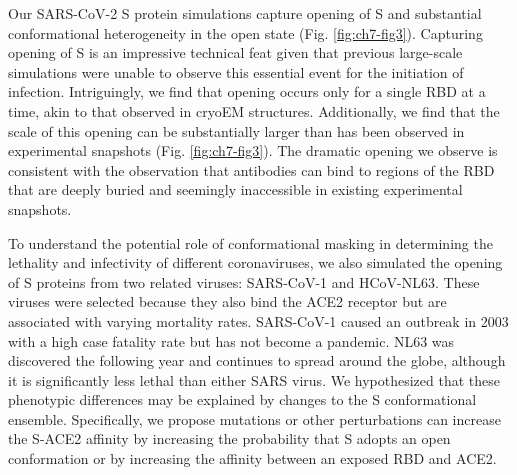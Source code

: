 \documentclass[../main.tex]{subfiles}
\begin{document}
        Our SARS-CoV-2 S protein simulations capture opening of S and substantial conformational heterogeneity in the open state (Fig. \ref{fig:ch7-fig3}). Capturing opening of S is an impressive technical feat given that previous large-scale simulations were unable to observe this essential event for the initiation of infection. Intriguingly, we find that opening occurs only for a single RBD at a time, akin to that observed in cryoEM structures\cite{yuan_cryo-em_2017}. Additionally, we find that the scale of this opening can be substantially larger than has been observed in experimental snapshots (Fig. \ref{fig:ch7-fig3}). The dramatic opening we observe is consistent with the observation that antibodies can bind to regions of the RBD that are deeply buried and seemingly inaccessible in existing experimental snapshots\cite{huo_neutralization_2020}.

        To understand the potential role of conformational masking in determining the lethality and infectivity of different coronaviruses, we also simulated the opening of S proteins from two related viruses: SARS-CoV-1 and HCoV-NL63. These viruses were selected because they also bind the ACE2 receptor but are associated with varying mortality rates. SARS-CoV-1 caused an outbreak in 2003 with a high case fatality rate but has not become a pandemic\cite{zhong_epidemiology_2003}. NL63 was discovered the following year and continues to spread around the globe, although it is significantly less lethal than either SARS virus\cite{van_der_hoek_identification_2004}. We hypothesized that these phenotypic differences may be explained by changes to the S conformational ensemble. Specifically, we propose mutations or other perturbations can increase the S-ACE2 affinity by increasing the probability that S adopts an open conformation or by increasing the affinity between an exposed RBD and ACE2.
\end{document}
